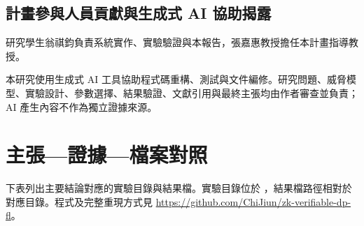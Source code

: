 \documentclass[12pt,a4paper]{article}
\begin{document}
\subsection{計畫參與人員貢獻與生成式 AI 協助揭露}
研究學生翁祺鈞負責系統實作、實驗驗證與本報告，張嘉惠教授擔任本計畫指導教授。

本研究使用生成式 AI 工具協助程式碼重構、測試與文件編修。研究問題、威脅模型、實驗設計、參數選擇、結果驗證、文獻引用與最終主張均由作者審查並負責；AI 產生內容不作為獨立證據來源。

\clearpage
{}
{}



\clearpage
\appendix
\section{主張—證據—檔案對照}
\label{app:evidence}
下表列出主要結論對應的實驗目錄與結果檔。實驗目錄位於 ，結果檔路徑相對於對應目錄。程式及完整重現方式見 \url{https://github.com/ChiJiun/zk-verifiable-dp-fl}。
\end{document}
